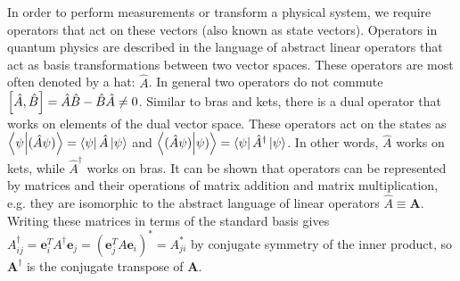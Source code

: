 \noindent In order to perform measurements or transform a physical system, we require operators that act on these vectors (also known as state vectors). Operators in quantum physics are described in the language of abstract linear operators that act as basis transformations between two vector spaces. These operators are most often denoted by a hat: $\hat{A}$. In general two operators do not commute $\comm{\Hat{A}}{\Hat{B}} = \hat{A}\hat{B}-\hat{B}\hat{A}\neq 0$. Similar to bras and kets, there is a dual operator that works on elements of the dual vector space. These operators act on the states as $\braket{\psi}{(\Hat{A}\psi)} = \bra{\psi}\Hat{A}\ket{\psi}$ and $\braket{(\Hat{A} \psi)}{\psi)} = \bra{\psi}\Hat{A}^\dagger\ket{\psi}$. In other words, $\hat{A}$ works on kets, while $\hat{A}^\dagger$ works on bras. It can be shown that operators can be represented by matrices and their operations of matrix addition and matrix multiplication, e.g. they are isomorphic to the abstract language of linear operators $\hat{A} \equiv \mathbf{A}$.
Writing these matrices in terms of the standard basis gives ${A}^\dagger_{ij} = \mathbf{e}_i^T{A}^\dagger \mathbf{e}_j = (\mathbf{e}_j^T {A} \mathbf{e}_i)^* = {A}^*_{ji}$ by conjugate symmetry of the inner product, so $\mathbf{A}^\dagger$ is the conjugate transpose of $\mathbf{A}$.\newline

